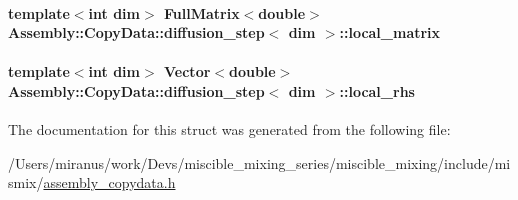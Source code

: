 \paragraph[{local\+\_\+matrix}]{\setlength{\rightskip}{0pt plus 5cm}template$<$int dim$>$ Full\+Matrix$<$double$>$ {\bf Assembly\+::\+Copy\+Data\+::diffusion\+\_\+step}$<$ dim $>$\+::local\+\_\+matrix}\label{struct_assembly_1_1_copy_data_1_1diffusion__step_ab71ebe2d993b5db8353c7285e2759325}
\hypertarget{struct_assembly_1_1_copy_data_1_1diffusion__step_ad5d3185b59f3f5c8b56727c7f7722390}{}
\paragraph[{local\+\_\+rhs}]{\setlength{\rightskip}{0pt plus 5cm}template$<$int dim$>$ Vector$<$double$>$ {\bf Assembly\+::\+Copy\+Data\+::diffusion\+\_\+step}$<$ dim $>$\+::local\+\_\+rhs}\label{struct_assembly_1_1_copy_data_1_1diffusion__step_ad5d3185b59f3f5c8b56727c7f7722390}


The documentation for this struct was generated from the following file\+:\begin{DoxyCompactItemize}
\item 
/\+Users/miranus/work/\+Devs/miscible\+\_\+mixing\+\_\+series/miscible\+\_\+mixing/include/mismix/\hyperlink{assembly__copydata_8h}{assembly\+\_\+copydata.\+h}\end{DoxyCompactItemize}
